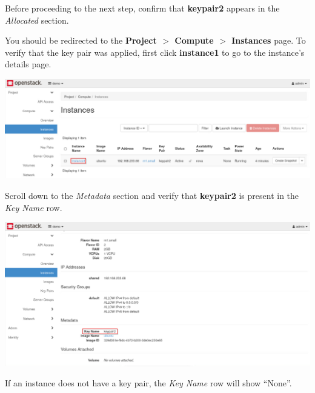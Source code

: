 \documentclass[letterpaper, 12pt]{article}
\begin{document}
\begin{enumerate}
    \begin{stopbox}
        Before proceeding to the next step, confirm that \textbf{keypair2} appears in the \textit{Allocated} section.
    \end{stopbox}

    \begin{labstep}
        You should be redirected to the \textbf{Project $>$ Compute $>$ Instances} page.
        To verify that the key pair was applied, first click \textbf{instance1} to go to the instance's details page.

        \begin{center}
            \includegraphics[width=\linewidth]{images/part4/step12.png}
        \end{center}
    \end{labstep}

    \begin{labstep}
        Scroll down to the \textit{Metadata} section and verify that \textbf{keypair2} is present in the \textit{Key Name} row.

        \begin{center}
            \includegraphics[width=\linewidth]{images/part4/step13.png}
        \end{center}
    \end{labstep}

    \begin{notebox}
        If an instance does not have a key pair, the \textit{Key Name} row will show ``None''.
    \end{notebox}


\end{enumerate}
\end{document}
